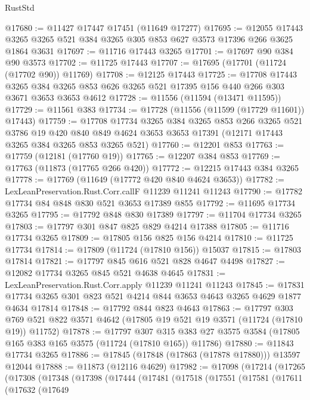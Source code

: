 \begin{lexlean}{RustStd}
\begin{coremodule}
@17680 := @11427 @17447 @17451 (@11649 @17277)
@17695 := @12055
    @17443
    @3265
    @3265
    @521
    @384
    @3265
    @305
    @853
    @627
    @3573
    @17396
    @266
    @3625
    @1864
    @3631
@17697 := @11716 @17443 @3265
@17701 := @17697 @90 @384 @90 @3573
@17702 := @11725 @17443
@17707 := @17695 (@17701 (@11724 (@17702 @90)) @11769)
@17708 := @12125 @17443
@17725 := @17708
    @17443
    @3265
    @384
    @3265
    @853
    @626
    @3265
    @521
    @17395
    @156
    @440
    @266
    @303
    @3671
    @3653
    @3653
    @4612
@17728 := @11556 (@11594 (@13471 @11595))
@17729 := @11561 @383
@17734 := @17728 (@11556 (@11599 (@17729 @11601)) @17443)
@17759 := @17708
    @17734
    @3265
    @384
    @3265
    @853
    @266
    @3265
    @521
    @3786
    @19
    @420
    @840
    @849
    @4624
    @3653
    @3653
    @17391
    (@12171 @17443 @3265 @384 @3265 @853 @3265 @521)
@17760 := @12201 @853
@17763 := @17759 (@12181 (@17760 @19))
@17765 := @12207 @384 @853
@17769 := @17763 (@11873 (@17765 @266 @420))
@17772 := @12215 @17443 @384 @3265
@17778 := @17769 (@11649 (@17772 @420 @840 @4624 @3653))
@17782 := LexLeanPreservation.Rust.Corr.callF @11239 @11241 @11243
@17790 := @17782 @17734 @84 @848 @830 @521 @3653 @17389 @855
@17792 := @11695 @17734 @3265
@17795 := @17792 @848 @830 @17389
@17797 := @11704 @17734 @3265
@17803 := @17797 @301 @847 @825 @829 @4214 @17388
@17805 := @11716 @17734 @3265
@17809 := @17805 @156 @825 @156 @4214
@17810 := @11725 @17734
@17814 := @17809 (@11724 (@17810 @156)) @15037
@17815 := @17803 @17814
@17821 := @17797 @845 @616 @521 @828 @4647 @4498
@17827 := @12082 @17734 @3265 @845 @521 @4638 @4645
@17831 := LexLeanPreservation.Rust.Corr.apply @11239 @11241 @11243
@17845 := @17831 @17734 @3265 @301 @823 @521 @4214 @844 @3653 @4643 @3265 @4629 @1877 @4634 @17814
@17848 := @17792 @844 @823 @4643
@17863 := @17797
    @303
    @769
    @521
    @822
    @3571
    @4642
    (@17805 @19 @521 @19 @3571 (@11724 (@17810 @19)) @11752)
@17878 := @17797
    @307
    @315
    @383
    @27
    @3575
    @3584
    (@17805 @165 @383 @165 @3575 (@11724 (@17810 @165)) @11786)
@17880 := @11843 @17734 @3265
@17886 := @17845 (@17848 (@17863 (@17878 @17880))) @13597 @12044
@17888 := @11873 (@12116 @4629)
@17982 := @17098
    (@17214
      (@17265
        (@17308
          (@17348
            (@17398
              (@17444
                (@17481
                  (@17518
                    (@17551
                      (@17581
                        (@17611
                          (@17632
                            (@17649

\end{coremodule}
\end{lexlean}
